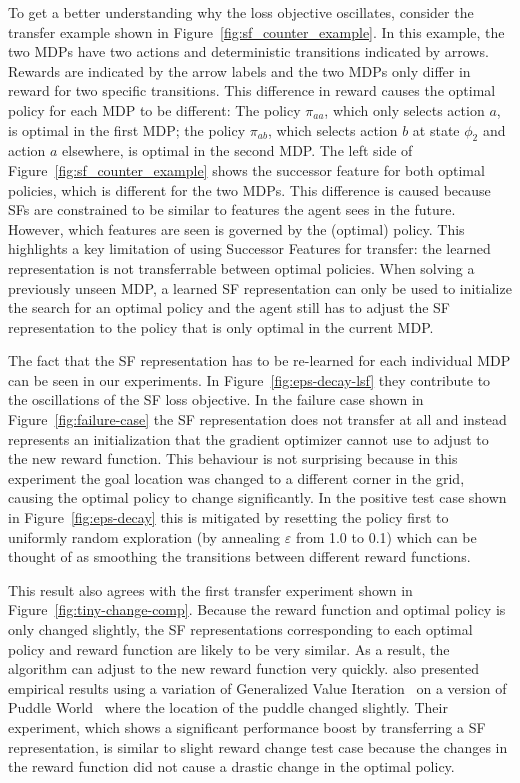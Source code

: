 \documentclass{article}
\begin{document}
To get a better understanding why the loss objective oscillates, consider the transfer example shown in Figure~\ref{fig:sf_counter_example}.
In this example, the two MDPs have two actions and deterministic transitions indicated by arrows. 
Rewards are indicated by the arrow labels and the two MDPs only differ in reward for two specific transitions.
This difference in reward causes the optimal policy for each MDP to be different: The policy $\pi_{aa}$, which only selects action $a$, is optimal in the first MDP; the policy $\pi_{ab}$, which selects action $b$ at state $\phi_2$ and action $a$ elsewhere, is optimal in the second MDP.
The left side of Figure~\ref{fig:sf_counter_example} shows the successor feature for both optimal policies, which is different for the two MDPs.
This difference is caused because SFs are constrained to be similar to features the agent sees in the future.
However, which features are seen is governed by the (optimal) policy.
This highlights a key limitation of using Successor Features for transfer: the learned representation is not transferrable between optimal policies.
When solving a previously unseen MDP, a learned SF representation can only be used to initialize the search for an optimal policy and the agent still has to adjust the SF representation to the policy that is only optimal in the current MDP.

The fact that the SF representation has to be re-learned for each individual MDP can be seen in our experiments.
In Figure~\ref{fig:eps-decay-lsf} they contribute to the oscillations of the SF loss objective. 
In the failure case shown in Figure~\ref{fig:failure-case} the SF representation does not transfer at all and instead represents an initialization that the gradient optimizer cannot use to adjust to the new reward function.
This behaviour is not surprising because in this experiment the goal location was changed to a different corner in the grid, causing the optimal policy to change significantly.
In the positive test case shown in Figure~\ref{fig:eps-decay} this is mitigated by resetting the policy first to uniformly random exploration (by annealing $\varepsilon$ from 1.0 to 0.1) which can be thought of as smoothing the transitions between different reward functions.

This result also agrees with the first transfer experiment shown in Figure~\ref{fig:tiny-change-comp}.
Because the reward function and optimal policy is only changed slightly, the SF representations corresponding to each optimal policy and reward function are likely to be very similar.
As a result, the algorithm can adjust to the new reward function very quickly.
\citeauthor{barreto2016successor} also presented empirical results using a variation of Generalized Value Iteration~\cite{Sutton98} on a version of Puddle World~\cite{sutton1996generalization} where the location of the puddle changed slightly.
Their experiment, which shows a significant performance boost by transferring a SF representation, is similar to slight reward change test case because the changes in the reward function did not cause a drastic change in the optimal policy.
\end{document}
